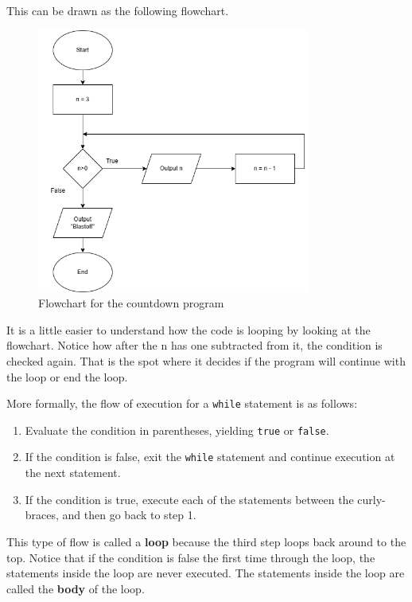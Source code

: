 This can be drawn as the following flowchart. 
\begin{figure}[h]
    \centering
    \includegraphics[width=9cm]{images/countdownwhileflow.png}
    \caption{Flowchart for the countdown program}
    \label{fig:countdownwhile}
\end{figure}
It is a little easier to understand how the code is looping by looking at the flowchart. Notice how after the n has one subtracted from it, the condition is checked again. That is the spot where it decides if the program will continue with the loop or end the loop.

More formally, the flow of execution for a {\tt while} statement
is as follows:

\begin{enumerate}

\item Evaluate the condition in parentheses, yielding {\tt true}
or {\tt false}.

\item If the condition is false, exit the {\tt while} statement
and continue execution at the next statement.

\item If the condition is true, execute each of the statements
between the curly-braces, and then go back to step 1.

\end{enumerate}

This type of flow is called a {\bf loop} because the third step loops
back around to the top.  Notice that if the condition is false the
first time through the loop, the statements inside the loop are
never executed.  The statements inside the loop are called
the {\bf body} of the loop.


